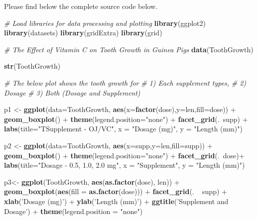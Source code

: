 \documentclass[]{article}
\newenvironment{Shaded}{\begin{snugshade}}{\end{snugshade}}
\newcommand{\KeywordTok}[1]{\textcolor[rgb]{0.13,0.29,0.53}{\textbf{{#1}}}}
\newcommand{\DataTypeTok}[1]{\textcolor[rgb]{0.13,0.29,0.53}{{#1}}}
\newcommand{\StringTok}[1]{\textcolor[rgb]{0.31,0.60,0.02}{{#1}}}
\newcommand{\CommentTok}[1]{\textcolor[rgb]{0.56,0.35,0.01}{\textit{{#1}}}}
\newcommand{\NormalTok}[1]{{#1}}
\begin{document}
Please find below the complete source code below.

\begin{Shaded}
\begin{Highlighting}[]
\CommentTok{# Load libraries for data processing and plotting}
\KeywordTok{library}\NormalTok{(ggplot2)}
\KeywordTok{library}\NormalTok{(datasets)}
\KeywordTok{library}\NormalTok{(gridExtra)}
\KeywordTok{library}\NormalTok{(grid)}

\CommentTok{# The Effect of Vitamin C on Tooth Growth in Guinea Pigs}
\KeywordTok{data}\NormalTok{(ToothGrowth)}

\KeywordTok{str}\NormalTok{(ToothGrowth)}

\CommentTok{# The below plot shows the tooth growth for }
\CommentTok{#    1) Each supplement types, }
\CommentTok{#    2) Dosage}
\CommentTok{#    3) Both (Dosage and Supplement)}

\NormalTok{p1 <-}\StringTok{ }\KeywordTok{ggplot}\NormalTok{(}\DataTypeTok{data=}\NormalTok{ToothGrowth, }\KeywordTok{aes}\NormalTok{(}\DataTypeTok{x=}\KeywordTok{factor}\NormalTok{(dose),}\DataTypeTok{y=}\NormalTok{len,}\DataTypeTok{fill=}\NormalTok{dose)) +}
\StringTok{     }\KeywordTok{geom_boxplot}\NormalTok{() +}
\StringTok{     }\KeywordTok{theme}\NormalTok{(}\DataTypeTok{legend.position=}\StringTok{"none"}\NormalTok{) +}\StringTok{ }
\StringTok{     }\KeywordTok{facet_grid}\NormalTok{(.~supp) +}
\StringTok{     }\KeywordTok{labs}\NormalTok{(}\DataTypeTok{title=}\StringTok{"TSupplement - OJ/VC"}\NormalTok{, }
          \DataTypeTok{x =} \StringTok{"Dosage (mg)"}\NormalTok{, }
          \DataTypeTok{y =} \StringTok{"Length (mm)"}\NormalTok{)}

\NormalTok{p2 <-}\StringTok{ }\KeywordTok{ggplot}\NormalTok{(}\DataTypeTok{data=}\NormalTok{ToothGrowth, }\KeywordTok{aes}\NormalTok{(}\DataTypeTok{x=}\NormalTok{supp,}\DataTypeTok{y=}\NormalTok{len,}\DataTypeTok{fill=}\NormalTok{supp)) +}
\StringTok{     }\KeywordTok{geom_boxplot}\NormalTok{() +}
\StringTok{     }\KeywordTok{theme}\NormalTok{(}\DataTypeTok{legend.position=}\StringTok{"none"}\NormalTok{) +}\StringTok{ }
\StringTok{     }\KeywordTok{facet_grid}\NormalTok{(.~dose)+}\StringTok{ }
\StringTok{     }\KeywordTok{labs}\NormalTok{(}\DataTypeTok{title=}\StringTok{"Dosage - 0.5, 1.0, 2.0 mg"}\NormalTok{, }
          \DataTypeTok{x =} \StringTok{"Supplement"}\NormalTok{, }
          \DataTypeTok{y =} \StringTok{"Length (mm)"}\NormalTok{)}

\NormalTok{p3<-}\StringTok{ }\KeywordTok{ggplot}\NormalTok{(ToothGrowth, }\KeywordTok{aes}\NormalTok{(}\KeywordTok{as.factor}\NormalTok{(dose), len)) +}
\StringTok{  }\KeywordTok{geom_boxplot}\NormalTok{(}\KeywordTok{aes}\NormalTok{(}\DataTypeTok{fill =} \KeywordTok{as.factor}\NormalTok{(dose))) +}\StringTok{ }
\StringTok{  }\KeywordTok{facet_grid}\NormalTok{(. ~}\StringTok{ }\NormalTok{supp) +}
\StringTok{  }\KeywordTok{xlab}\NormalTok{(}\StringTok{'Dosage (mg)'}\NormalTok{) +}
\StringTok{  }\KeywordTok{ylab}\NormalTok{(}\StringTok{'Length (mm)'}\NormalTok{) +}
\StringTok{  }\KeywordTok{ggtitle}\NormalTok{(}\StringTok{'Supplement and Dosage'}\NormalTok{) +}
\StringTok{  }\KeywordTok{theme}\NormalTok{(}\DataTypeTok{legend.position =} \StringTok{"none"}\NormalTok{)}


\end{Highlighting}
\end{Shaded}
\end{document}
